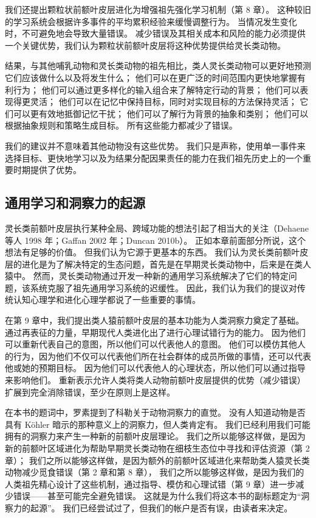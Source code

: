 我们还提出颗粒状前额叶皮层进化为增强祖先强化学习机制（第 8 章）。 这种较旧的学习系统会根据许多事件的平均累积经验来缓慢调整行为。 当情况发生变化时，不可避免地会导致大量错误。 减少错误及其相关成本和风险的能力必须提供一个关键优势，我们认为颗粒状前额叶皮层将这种优势提供给灵长类动物。
\par 
结果，与其他哺乳动物和灵长类动物的祖先相比，类人灵长类动物可以更好地预测它们应该做什么以及将发生什么； 他们可以在更广泛的时间范围内更快地掌握有利行为； 他们可以通过更多样化的输入组合来了解特定行动的背景； 他们可以表现得更灵活； 他们可以在记忆中保持目标，同时对实现目标的方法保持灵活； 它们可以更有效地抵御记忆干扰； 他们可以了解行为背景的抽象和类别； 他们可以根据抽象规则和策略生成目标。 所有这些能力都减少了错误。
\par 
我们的建议并不意味着其他动物没有这些优势。 我们只是声称，使用单一事件来选择目标、更快地学习以及为结果分配因果责任的能力在我们祖先历史上的一个重要时期提供了优势。
\subsection{通用学习和洞察力的起源}
灵长类前额叶皮层执行某种全局、跨域功能的想法引起了相当大的关注（Dehaene 等人 1998 年；Gaffan 2002 年；Duncan 2010b）。 正如本章前面部分所说，这个想法有足够的价值。 但我们认为它源于更基本的东西。 我们认为灵长类前额叶皮层的进化是为了解决特定的生态问题，首先是在早期灵长类动物中，后来是在类人猿中。 然而，灵长类动物通过开发一种新的通用学习系统解决了它们的特定问题，该系统克服了祖先通用学习系统的迟缓性。 因此，我们认为我们的提议对传统认知心理学和进化心理学都说了一些重要的事情。
\par 
在第 9 章中，我们提出类人猿前额叶皮层的基本功能为人类洞察力奠定了基础。 通过再表征的力量，早期现代人类进化出了进行心理试错行为的能力。 因为他们可以重新代表自己的意图，所以他们可以代表他人的意图。 他们可以模仿其他人的行为，因为他们不仅可以代表他们所在社会群体的成员所做的事情，还可以代表他或她的预期目标。 因为他们可以代表他人的心理状态，所以他们可以通过指导来影响他们。 重新表示允许人类将类人动物前额叶皮层提供的优势（减少错误）扩展到完全消除错误，至少在原则上是这样。
\par 
在本书的题词中，罗素提到了科勒关于动物洞察力的直觉。 没有人知道动物是否具有 Köhler 暗示的那种意义上的洞察力，但人类肯定有。 我们已经利用我们可能拥有的洞察力来产生一种新的前额叶皮层理论。 我们之所以能够这样做，是因为新的前额叶区域进化为帮助早期灵长类动物在细枝生态位中寻找和评估资源（第 2 章）； 我们之所以能够这样做，是因为额外的前额叶区域进化来帮助类人猿灵长类动物减少觅食错误（第 2 章和第 8 章）， 我们之所以能够这样做，是因为我们的人类祖先精心设计了这些机制，通过指导、模仿和心理试错（第 9 章）进一步减少错误——甚至可能完全避免错误。 这就是为什么我们将这本书的副标题定为“洞察力的起源”。 我们已经尝试过了，但我们的帐户是否有误，由读者来决定。
